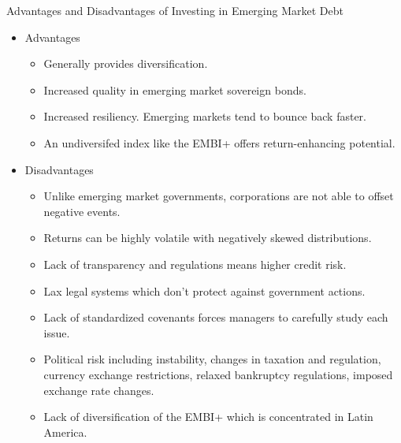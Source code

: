 \documentclass[../custom]{flashcards}
\begin{document}
\begin{flashcard}{Advantages and Disadvantages of Investing in Emerging Market Debt}
    \begin{itemize}
        \item Advantages
            \begin{itemize}
                \item Generally provides diversification.
                \item Increased quality in emerging market sovereign bonds.
                \item Increased resiliency. Emerging markets tend to bounce back faster.
                \item An undiversifed index like the EMBI+ offers return-enhancing potential.
            \end{itemize}
        \item Disadvantages
            \begin{itemize}
                \item Unlike emerging market governments, corporations are not able to offset negative events.
                \item Returns can be highly volatile with negatively skewed distributions.
                \item Lack of transparency and regulations means higher credit risk.
                \item Lax legal systems which don't protect against government actions.
                \item Lack of standardized covenants forces managers to carefully study each issue.
                \item Political risk including instability, changes in taxation and regulation, currency exchange restrictions, relaxed bankruptcy regulations, imposed exchange rate changes.
                \item Lack of diversification of the EMBI+ which is concentrated in Latin America.
            \end{itemize}
    \end{itemize}
\end{flashcard}
\end{document}
